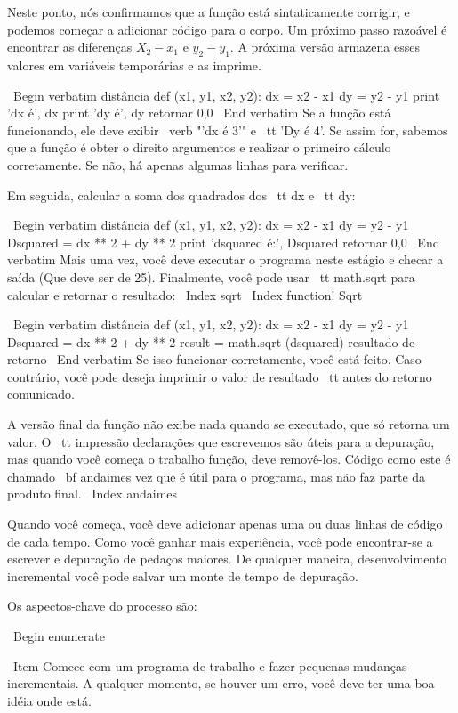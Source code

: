 \documentclass[10pt]{book}
\begin{document}
{{{{Neste ponto, nós confirmamos que a função está sintaticamente
corrigir, e podemos começar a adicionar código para o corpo.
Um próximo passo razoável é encontrar as diferenças
$ X_2 - x_1 $ e $ y_2 - y_1 $. A próxima versão armazena esses valores em
variáveis ​​temporárias e as imprime.

\ Begin {verbatim}
distância def (x1, y1, x2, y2):
    dx = x2 - x1
    dy = y2 - y1
    print 'dx é', dx
    print 'dy é', dy
    retornar 0,0
\ End {verbatim}
%
Se a função está funcionando, ele deve exibir \ verb "'dx é 3'" e {\ tt
'Dy é 4'}. Se assim for, sabemos que a função é obter o direito
argumentos e realizar o primeiro cálculo corretamente. Se não,
há apenas algumas linhas para verificar.

Em seguida, calcular a soma dos quadrados dos {\ tt dx} e {\ tt dy}:

\ Begin {verbatim}
distância def (x1, y1, x2, y2):
    dx = x2 - x1
    dy = y2 - y1
    Dsquared = dx ** 2 + dy ** 2
    print 'dsquared é:', Dsquared
    retornar 0,0
\ End {verbatim}
%
Mais uma vez, você deve executar o programa neste estágio e checar a saída
(Que deve ser de 25).
Finalmente, você pode usar {\ tt math.sqrt} para calcular e retornar o resultado:
\ Index {sqrt}
\ Index {function! Sqrt}

\ Begin {verbatim}
distância def (x1, y1, x2, y2):
    dx = x2 - x1
    dy = y2 - y1
    Dsquared = dx ** 2 + dy ** 2
    result = math.sqrt (dsquared)
    resultado de retorno
\ End {verbatim}
%
Se isso funcionar corretamente, você está feito. Caso contrário, você pode
deseja imprimir o valor de {resultado \ tt} antes do retorno
comunicado.

A versão final da função não exibe nada quando se
executado, que só retorna um valor. O {\ tt impressão} declarações que escrevemos
são úteis para a depuração, mas quando você começa o trabalho função,
deve removê-los. Código como este é chamado {\ bf andaimes}
vez que é útil para o programa, mas não faz parte da
produto final.
\ Index {} andaimes

Quando você começa, você deve adicionar apenas uma ou duas linhas de código de cada
tempo. Como você ganhar mais experiência, você pode encontrar-se a escrever
e depuração de pedaços maiores. De qualquer maneira, desenvolvimento incremental
você pode salvar um monte de tempo de depuração.

Os aspectos-chave do processo são:

\ Begin {enumerate}

\ Item Comece com um programa de trabalho e fazer pequenas mudanças incrementais. 
A qualquer momento, se houver um erro, você deve ter uma boa idéia
onde está.

}}}}
\end{document}
